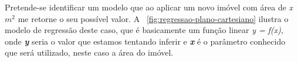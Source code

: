 \begin{table}[h!]
\end{table} 

Pretende-se identificar um modelo que ao aplicar um novo imóvel com área de \textit{x $m^2$} me retorne o seu possível valor. A ~\autoref{fig:regressao-plano-cartesiano} ilustra 
o modelo de regressão deste caso, que é basicamente um função linear \textit{y = f(x)}, onde \textbf{\textit{y}} seria o valor que estamos tentando inferir e \textbf{\textit{x}} é o parâmetro 
conhecido que será utilizado, neste caso a área do imóvel.

\begin{figure}[ht!]
	\centering
\end{figure}
